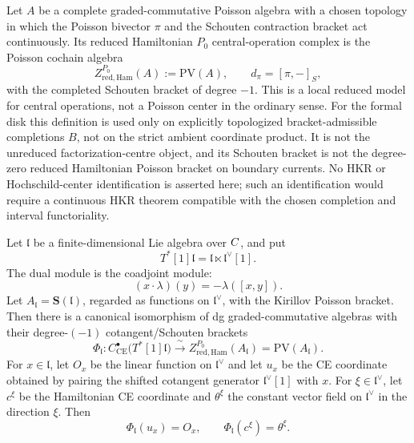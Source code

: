 \documentclass[11pt]{memoir}
\begin{document}
\begin{defn}\label{defn:reduced-hamiltonian-p0-center}
  Let \(A\) be a complete graded-commutative Poisson algebra with a
  chosen topology in which the Poisson bivector \(\pi\) and the
  Schouten contraction bracket act continuously. Its reduced
  Hamiltonian \(P_0\) central-operation complex is the Poisson cochain algebra
  \[
    Z^{P_0}_{\mathrm{red,Ham}}(A)
      :=\mathrm{PV}(A),\qquad d_{\pi}=[\pi,-]_S,
  \]
  with the completed Schouten bracket of degree \(-1\). This is a local
  reduced model for central operations, not a Poisson center in the
  ordinary sense. For the formal disk this definition is used only on
  explicitly topologized bracket-admissible completions \(B\), not on the
  strict ambient coordinate product. It is not the unreduced
  factorization-centre object, and its Schouten bracket is not the
  degree-zero reduced Hamiltonian Poisson bracket on boundary currents.
  No HKR or Hochschild-center identification is asserted here; such an
  identification would require a continuous HKR theorem compatible with
  the chosen completion and interval functoriality.
\end{defn}

\begin{thm}
  \label{thm:coordinate-free-cotangent-ce-pv}
  Let \(\mathfrak l\) be a finite-dimensional Lie algebra over \(C\), and
  put
	  \[
	    T^*[1]\mathfrak l=\mathfrak l\ltimes\mathfrak l^\vee[1].
	  \]
  The dual module is the coadjoint module:
  \[
    (x\cdot\lambda)(y)=-\lambda([x,y]).
  \]
	  Let \(A_{\mathfrak l}=\mathbf S(\mathfrak l)\), regarded as functions on
  \(\mathfrak l^\vee\), with the Kirillov Poisson bracket. Then there is a
  canonical isomorphism of dg graded-commutative algebras with their
  degree-\((-1)\) cotangent/Schouten brackets
  \[
    \Phi_{\mathfrak l}:
    C^\bullet_{\mathrm{CE}}\bigl(T^*[1]\mathfrak l\bigr)
      \xrightarrow{\ \sim\ }
    Z^{P_0}_{\mathrm{red,Ham}}(A_{\mathfrak l})
      =\mathrm{PV}(A_{\mathfrak l}).
  \]
  For \(x\in\mathfrak l\), let \(O_x\) be the linear function on
  \(\mathfrak l^\vee\) and let \(u_x\) be the CE coordinate obtained by
  pairing the shifted cotangent generator
  \(\mathfrak l^\vee[1]\) with \(x\). For
  \(\xi\in\mathfrak l^\vee\), let \(c^\xi\) be the Hamiltonian CE
  coordinate and \(\theta^\xi\) the constant vector field on
  \(\mathfrak l^\vee\) in the direction \(\xi\). Then
  \[
    \Phi_{\mathfrak l}(u_x)=O_x,\qquad
    \Phi_{\mathfrak l}(c^\xi)=\theta^\xi .
  \]
\end{thm}
\end{document}

